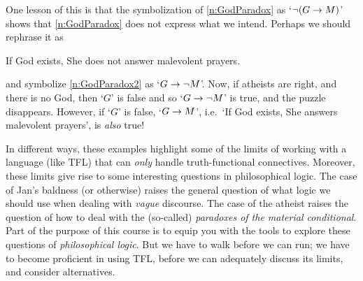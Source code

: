         One lesson of this is that the symbolization of \ref{n:GodParadox} as `$\neg(G \rightarrow M)$' shows that \ref{n:GodParadox} does not express what we intend. Perhaps we should rephrase it as
        	\begin{earg}
                \item[\ex{n:GodParadox2}] If God exists, She does not answer malevolent prayers.
  \end{earg}
and symbolize \ref{n:GodParadox2} as `$G \rightarrow \neg M$'.  Now, if atheists are right, and there is no God, then `$G$' is false and so `$G \rightarrow \neg M$' is true, and the puzzle disappears. However, if `$G$' is false, `$G \rightarrow M$', i.e.\ `If God exists, She answers malevolent prayers', is \emph{also} true!

In different ways, these  examples highlight some of the limits of working with a language (like TFL) that can \emph{only} handle truth-functional connectives. Moreover, these limits give rise to some interesting questions in philosophical logic. The case of Jan's baldness (or otherwise) raises the general question of what logic we should use when dealing with \emph{vague} discourse. The case of the atheist raises the question of how to deal with the (so-called) \emph{paradoxes of the material conditional}. Part of the purpose of this course is to equip you with the tools to explore these questions of \emph{philosophical logic}. But we have to walk before we can run; we have to become proficient in using TFL, before we can adequately discuss its limits, and consider alternatives.

